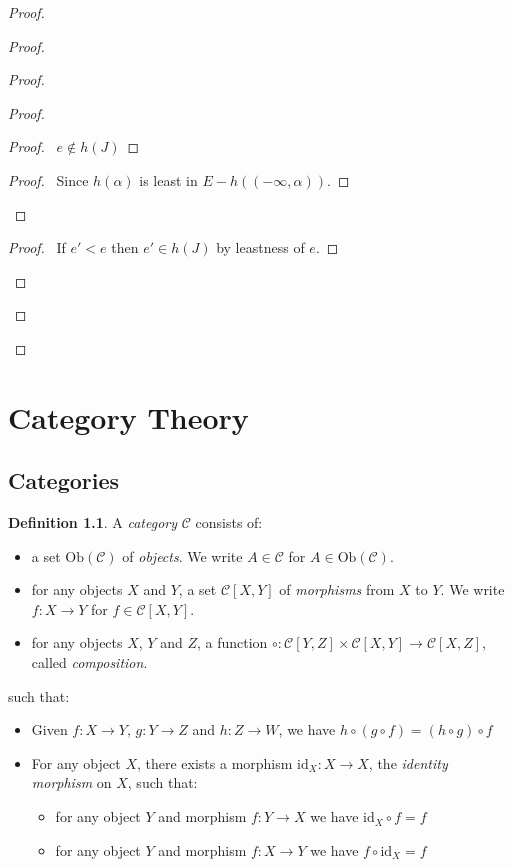 \documentclass{book}
\let\qed\relax
\theoremstyle{definition}
\newtheorem{df}[ax]{Definition}
\newcommand{\id}[1]{\ensuremath{\mathrm{id}_{#1}}}
\newcommand{\Ob}[1]{\ensuremath{\mathrm{Ob} \left( {#1} \right)}}
\begin{document}
\begin{proof}
\begin{proof}
\begin{proof}
		\begin{proof}
			\begin{proof}
				\pf\ $e \notin h(J)$
			\end{proof}
			\begin{proof}
				\pf\ Since $h(\alpha)$ is least in $E - h((-\infty, \alpha))$.
			\end{proof}
		\end{proof}
		\begin{proof}
			\pf\ If $e' < e$ then $e' \in h(J)$ by leastness of $e$.
		\end{proof}
	\end{proof}
\end{proof}
\qed
\end{proof}

\chapter{Category Theory}

\section{Categories}

\begin{df}
A \emph{category} $\mathcal{C}$ consists of:
\begin{itemize}
\item a set $\Ob{\mathcal{C}}$ of \emph{objects}. We write $A \in \mathcal{C}$ for $A \in \Ob{\mathcal{C}}$.
\item for any objects $X$ and $Y$, a set $\mathcal{C}[X,Y]$ of \emph{morphisms} from $X$ to $Y$. We write $f : X \rightarrow Y$ for $f \in \mathcal{C}[X,Y]$.
\item for any objects $X$, $Y$ and $Z$, a function $\circ : \mathcal{C}[Y,Z] \times \mathcal{C}[X,Y] \rightarrow \mathcal{C}[X,Z]$, called \emph{composition}.
\end{itemize}
such that:
\begin{itemize}
\item Given $f : X \rightarrow Y$, $g : Y \rightarrow Z$ and $h : Z \rightarrow W$, we have $h \circ (g \circ f) = (h \circ g) \circ f$
\item For any object $X$, there exists a morphism $\id{X} : X \rightarrow X$, the \emph{identity morphism} on $X$, such that:
\begin{itemize}
\item for any object $Y$ and morphism $f : Y \rightarrow X$ we have $\id{X} \circ f = f$
\item for any object $Y$ and morphism $f : X \rightarrow Y$ we have $f \circ \id{X} = f$
\end{itemize} 
\end{itemize}
\end{df}
\end{document}
